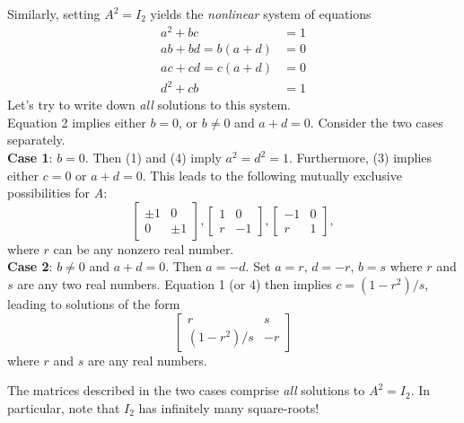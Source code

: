 \begin{solution}
Similarly, setting $A^2=I_2$ yields the {\em nonlinear} system of equations 
\begin{align*}
a^2+bc&=1\tag{1}\\
ab+bd=b(a+d)&=0\tag{2}\\
ac+cd=c(a+d)&=0\tag{3}\\
d^2+cb&=1\tag{4}
\end{align*}
Let's try to write down {\em all} solutions to this system. 
\\
Equation 2 implies either $b=0$, or $b\ne 0$ and $a+d=0$. Consider the two cases separately. 
\\
{\bf Case 1}: $b=0$. Then (1) and (4) imply $a^2=d^2=1$. Furthermore, (3) implies either $c=0$ or $a+d=0$. This leads to the following mutually exclusive possibilities for $A$:
\[
\begin{bmatrix}
\pm1&0\\
0&\pm 1
\end{bmatrix}, \begin{bmatrix}
1&0\\
r&-1
\end{bmatrix}, \begin{bmatrix}
-1&0\\
r&1
\end{bmatrix},
\]
where $r$ can be any nonzero real number. \\
{\bf Case 2}: $b\ne 0$ and $a+d=0$. Then $a=-d$. Set $a=r$, $d=-r$, $b=s$ where $r$ and $s$ are any two real numbers. Equation 1 (or 4) then implies $c=(1-r^2)/s$, leading to solutions of the form
\[
\begin{bmatrix}
r&s\\
(1-r^2)/s&-r
\end{bmatrix}
\]
where $r$ and $s$ are any real numbers. 
 
 The matrices described in the two cases comprise {\em all} solutions to $A^2=I_2$. In particular, note that $I_2$ has infinitely many square-roots! 
\end{solution}


